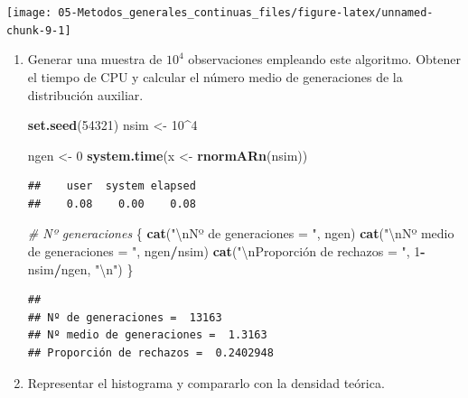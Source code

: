 \documentclass[]{book}
\newenvironment{Shaded}{\begin{snugshade}}{\end{snugshade}}
\newcommand{\KeywordTok}[1]{\textcolor[rgb]{0.13,0.29,0.53}{\textbf{#1}}}
\newcommand{\DecValTok}[1]{\textcolor[rgb]{0.00,0.00,0.81}{#1}}
\newcommand{\CharTok}[1]{\textcolor[rgb]{0.31,0.60,0.02}{#1}}
\newcommand{\StringTok}[1]{\textcolor[rgb]{0.31,0.60,0.02}{#1}}
\newcommand{\CommentTok}[1]{\textcolor[rgb]{0.56,0.35,0.01}{\textit{#1}}}
\newcommand{\OperatorTok}[1]{\textcolor[rgb]{0.81,0.36,0.00}{\textbf{#1}}}
\newcommand{\NormalTok}[1]{#1}
\theoremstyle{definition}
\theoremstyle{definition}
\theoremstyle{definition}
\theoremstyle{remark}
\begin{document}
\begin{center}\texttt{[image: 05-Metodos\_generales\_continuas\_files/figure-latex/unnamed-chunk-9-1]} \end{center}

\begin{enumerate}
\def\labelenumi{\alph{enumi})}
\item
  Generar una muestra de \(10^{4}\) observaciones empleando este
  algoritmo. Obtener el tiempo de CPU y calcular el número medio de
  generaciones de la distribución auxiliar.

\begin{Shaded}
\begin{Highlighting}[]
\KeywordTok{set.seed}\NormalTok{(}\DecValTok{54321}\NormalTok{)}
\NormalTok{nsim <-}\StringTok{ }\DecValTok{10}\OperatorTok{^}\DecValTok{4}

\NormalTok{ngen <-}\StringTok{ }\DecValTok{0}
\KeywordTok{system.time}\NormalTok{(x <-}\StringTok{ }\KeywordTok{rnormARn}\NormalTok{(nsim))}
\end{Highlighting}
\end{Shaded}

\begin{verbatim}
##    user  system elapsed 
##    0.08    0.00    0.08
\end{verbatim}

\begin{Shaded}
\begin{Highlighting}[]
\CommentTok{# Nº generaciones}
\NormalTok{\{}
\KeywordTok{cat}\NormalTok{(}\StringTok{"}\CharTok{\textbackslash{}n}\StringTok{Nº de generaciones = "}\NormalTok{, ngen)}
\KeywordTok{cat}\NormalTok{(}\StringTok{"}\CharTok{\textbackslash{}n}\StringTok{Nº medio de generaciones = "}\NormalTok{, ngen}\OperatorTok{/}\NormalTok{nsim)}
\KeywordTok{cat}\NormalTok{(}\StringTok{"}\CharTok{\textbackslash{}n}\StringTok{Proporción de rechazos = "}\NormalTok{, }\DecValTok{1}\OperatorTok{-}\NormalTok{nsim}\OperatorTok{/}\NormalTok{ngen, }\StringTok{"}\CharTok{\textbackslash{}n}\StringTok{"}\NormalTok{)}
\NormalTok{\}}
\end{Highlighting}
\end{Shaded}

\begin{verbatim}
## 
## Nº de generaciones =  13163
## Nº medio de generaciones =  1.3163
## Proporción de rechazos =  0.2402948
\end{verbatim}
\item
  Representar el histograma y compararlo con la densidad teórica.


\end{enumerate}
\end{document}
